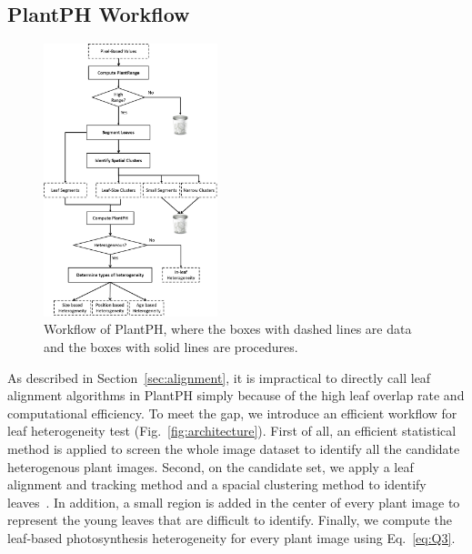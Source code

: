 \documentclass{bioinfo}
\begin{document}
\begin{methods}
\subsection{PlantPH Workflow}

\begin{figure}
  \centering
  \includegraphics[width=0.45\textwidth]{workflowchart-detail.png}\vspace{-0.1in}
  \caption{Workflow of PlantPH, where the boxes with dashed lines are data and the boxes with solid lines are procedures.}\label{fig:workflow}\vspace{-0.2in}
\end{figure}


As described in Section~\ref{sec:alignment}, it is impractical to directly call leaf alignment algorithms in PlantPH simply because of the high leaf overlap rate and computational efficiency. To meet the gap, we introduce an efficient workflow for leaf heterogeneity test (Fig.~\ref{fig:architecture}).
%
First of all, an efficient statistical method is applied to screen the whole image dataset to identify all the candidate heterogenous plant images. Second, on the candidate set, we apply a leaf alignment and tracking method and a spacial clustering method to identify leaves~\citep{ester1996density,kriegel2011density,xi2014tracking,yin2014}. In addition, a small region is added in the center of every plant image to represent the young leaves that are difficult to identify. Finally, we compute the leaf-based photosynthesis heterogeneity for every plant image using Eq.~\ref{eq:Q3}.
%


\end{methods}
\end{document}
